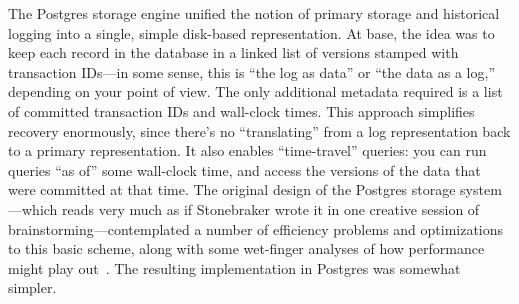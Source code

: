 \documentclass[sigconf,natbib=false]{acmart}
\begin{document}
The Postgres storage engine unified the notion of primary storage and historical logging into a single, simple disk-based representation. At base, the idea was to keep each record in the database in a linked list of versions stamped with transaction IDs---in some sense, this is ``the log as data'' or ``the data as a log,'' depending on your point of view. The only additional metadata required is a list of committed transaction IDs and wall-clock times. This approach simplifies recovery enormously, since there's no ``translating'' from a log representation back to a primary representation. It also enables ``time-travel'' queries: you can run queries ``as of'' some wall-clock time, and access the versions of the data that were committed at that time. The original design of the Postgres storage system---which reads very much as if Stonebraker wrote it in one creative session of brainstorming---contemplated a number of efficiency problems and optimizations to this basic scheme, along with some wet-finger analyses of how performance might play out~\cite{Stonebraker:1987:DPS:645914.671639}. The resulting implementation in Postgres was somewhat simpler.
\end{document}
